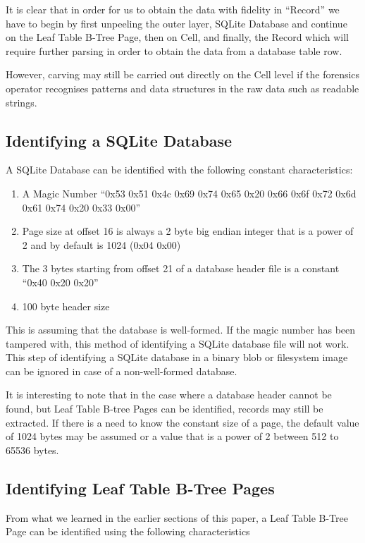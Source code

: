 \documentclass{article}
\begin{document}
It is clear that in order for us to obtain the data with fidelity in “Record” we have to begin by first unpeeling the outer layer, SQLite Database and continue on the Leaf Table B-Tree Page, then on Cell, and finally, the Record which will require further parsing in order to obtain the data from a database table row.

However, carving may still be carried out directly on the Cell level if the forensics operator recognises patterns and data structures in the raw data such as readable strings.

\subsection{Identifying a SQLite Database}

A SQLite Database can be identified with the following constant characteristics:
\begin{enumerate}
  \item A Magic Number ``0x53 0x51 0x4c 0x69 0x74 0x65 0x20 0x66 0x6f 0x72 0x6d 0x61 0x74 0x20 0x33 0x00''
  \item Page size at offset 16 is always a 2 byte big endian integer that is a power of 2 and by default is 1024 (0x04 0x00)
  \item The 3 bytes starting from offset 21 of a database header file is a constant “0x40 0x20 0x20”
  \item 100 byte header size
\end{enumerate}

This is assuming that the database is well-formed. If the magic number has been tampered with, this method of identifying a SQLite database file will not work. This step of identifying a SQLite database in a binary blob or filesystem image can be ignored in case of a non-well-formed database.

It is interesting to note that in the case where a database header cannot be found, but Leaf Table B-tree Pages can be identified, records may still be extracted. If there is a need to know the constant size of a page, the default value of 1024 bytes may be assumed or a value that is a power of 2 between 512 to 65536 bytes. 

\subsection{Identifying Leaf Table B-Tree Pages}
\noindent From what we learned in the earlier sections of this paper, a Leaf Table B-Tree Page can be identified using the following characteristics
\end{document}
